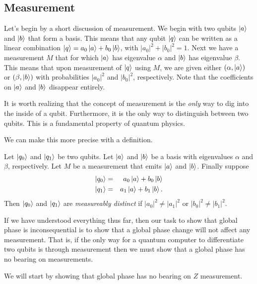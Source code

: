 \documentclass{article}
\begin{document}
\subsection{Measurement}
Let's begin by a short discussion of measurement. We begin with
two qubits $\ket{a}$ and $\ket{b}$ that form a basis. This means 
that any qubit $\ket{q}$ can be written as a linear combination
$\ket{q}=a_0\ket{a}+b_0\ket{b}$, with $|a_0|^2+|b_0|^2=1$. Next
we have a measurement $M$ that for which $\ket{a}$ has eigenvalue 
$\alpha$ and $\ket{b}$ has eigenvalue $\beta$. This means that
upon measurement of $\ket{q}$ using $M$, we are given either 
$(\alpha,\ket{a})$ or $(\beta,\ket{b})$ with probabilities
$|a_0|^2$ and $|b_0|^2$, respectively. Note that the coefficients 
on $\ket{a}$ and $\ket{b}$ disappear entirely.

It is worth realizing that the concept of measurement is the 
\textit{only} way to dig into the inside of a qubit. Furthermore, 
it is the only way to distinguish between two qubits. This is 
a fundamental property of quantum physics.

We can make this more precise with a definition.

\begin{definition}
  Let $\ket{q_0}$ and $\ket{q_1}$ be two qubits. Let $\ket{a}$
  and $\ket{b}$ be a basis with eigenvalues $\alpha$ and $\beta$, 
  respectively. Let $M$ be a measurement that emits $\ket{a}$ 
  and $\ket{b}$. Finally suppose
  \begin{eqnarray*}
    \ket{q_0}&=&a_0\ket{a}+b_0\ket{b}\\
    \ket{q_1}&=&a_1\ket{a}+b_1\ket{b}.
  \end{eqnarray*}
  Then $\ket{q_0}$ and $\ket{q_1}$ are \textit{measureably distinct}
  if $|a_0|^2\ne|a_1|^2$ or $|b_0|^2\ne|b_1|^2$.
\end{definition}

If we have understood everything thus far, then our task to show
that global phase is inconsequential is to show that a global phase
change will not affect any measurement. That is, if the only way
for a quantum computer to differentiate two qubits is through 
measurement then we must show that a global phase has no bearing
on measurements.

We will start by showing that global phase has no bearing on 
$Z$ measurement.
\end{document}
